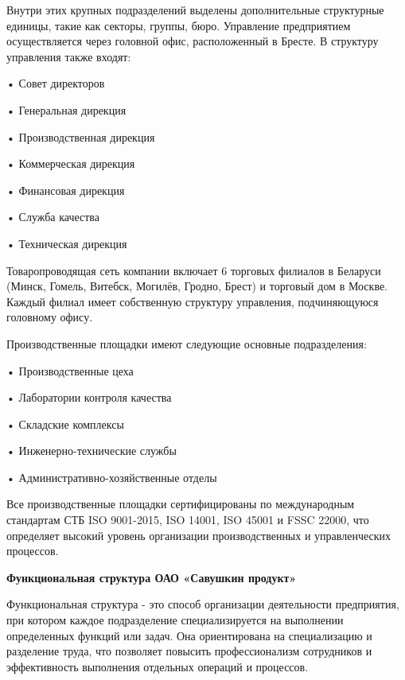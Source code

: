 {  \par \redline Внутри этих крупных подразделений выделены дополнительные структурные единицы, такие как секторы, группы, бюро. Управление предприятием осуществляется через головной офис, расположенный в Бресте. В структуру управления также входят:
  
  \par \redline • Совет директоров
  \par \redline • Генеральная дирекция
  \par \redline • Производственная дирекция
  \par \redline • Коммерческая дирекция
  \par \redline • Финансовая дирекция
  \par \redline • Служба качества
  \par \redline • Техническая дирекция

  \par \redline Товаропроводящая сеть компании включает 6 торговых филиалов в Беларуси\\(Минск, Гомель, Витебск, Могилёв, Гродно, Брест) и торговый дом в Москве. Каждый филиал имеет собственную структуру управления, подчиняющуюся головному офису.

  \par \redline Производственные площадки имеют следующие основные подразделения:
  
  \par \redline • Производственные цеха
  \par \redline • Лаборатории контроля качества
  \par \redline • Складские комплексы
  \par \redline • Инженерно-технические службы
  \par \redline • Административно-хозяйственные отделы

  \par \redline Все производственные площадки сертифицированы по международным стандартам СТБ ISO 9001-2015, ISO 14001, ISO 45001 и FSSC 22000, что определяет высокий уровень организации производственных и управленческих процессов.

  \par \redline \textbf{Функциональная структура ОАО «Савушкин продукт»}

  \par \redline Функциональная структура - это способ организации деятельности предприятия, при котором каждое подразделение специализируется на выполнении определенных функций или задач. Она ориентирована на специализацию и разделение труда, что позволяет повысить профессионализм сотрудников и эффективность выполнения отдельных операций и процессов.

}
